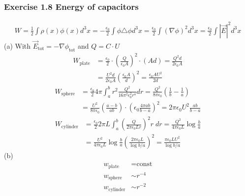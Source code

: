 \documentclass[10pt,a4paper]{book}
\theoremstyle{definition}
\begin{document}
\subsubsection{Exercise 1.8 Energy of capacitors}
\begin{align}
W
=\frac{1}{2}\int\rho(x)\phi(x)d^3x
=-\frac{\epsilon_0}{2}\int\phi\triangle\phi d^3x
=\frac{\epsilon_0}{2}\int(\nabla\phi)^2 d^3x
=\frac{\epsilon_0}{2}\int|\vec{E}|^2 d^3x
\end{align}
(a) With $\vec{E}_\text{tot}=-\nabla\phi_\text{tot}$ and $Q=C\cdot U$
\begin{align}
W_\text{plate}&=\frac{\epsilon_0}{2}\cdot\left(\frac{Q}{\epsilon_0A}\right)^2\cdot(Ad)=\frac{Q^2d}{2\epsilon_0A}\\
&=\frac{U^2d}{2\epsilon_0A}\left(\frac{\epsilon_0A}{d}\right)^2=
\frac{\epsilon_0AU^2}{2d}
\end{align}
\begin{align}
W_\text{sphere}&=\frac{\epsilon_0}{2}4\pi\int_a^br^2\frac{Q^2}{16\pi^2\epsilon_0^2r^4}dr=\frac{Q^2}{8\pi\epsilon_0}\left(\frac{1}{b}-\frac{1}{a}\right)\\
&=\frac{U^2}{8\pi\epsilon_0}\left(\frac{a-b}{ab}\right)\cdot\left(\epsilon_0\frac{4\pi ab}{b-a}\right)^2=2\pi\epsilon_0U^2\frac{ab}{b-a}
\end{align}
\begin{align}
W_\text{cylinder}&=\frac{\epsilon_0}{2}2\pi L\int_a^b\left(\frac{Q}{2\pi\epsilon_0Lr}\right)^2r\;dr
=\frac{Q^2}{4\pi\epsilon_0L}\log\frac{b}{a}\\
&=\frac{U^2}{4\pi\epsilon_0L}\log\frac{b}{a}\left(\frac{2\pi\epsilon_0 L}{\log b/a}\right)^2=\frac{\pi\epsilon_0LU^2}{\log b/a}
\end{align}
(b) 
\begin{align}
w_\text{plate}&=\text{const}\\
w_\text{sphere}&\sim r^{-4}\\
w_\text{cylinder}&\sim r^{-2}
\end{align}
\end{document}
